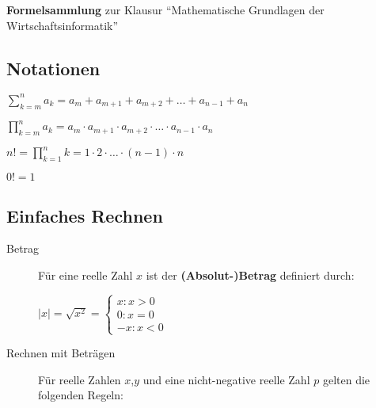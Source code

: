 \documentclass[9pt,ngerman,a4paper,landscape]{scrartcl}
\date{}
\providecommand{\tightlist}{%
  \setlength{\itemsep}{0pt}\setlength{\parskip}{0pt}}
\begin{document}
%
%
%

{\Huge\sffamily\textcolor{FOMVoll}{{\bfseries Formelsammlung} zur Klausur \enquote{Mathematische Grundlagen der Wirtschaftsinformatik}}}

\setlength{\columnsep}{0.75cm}
\begin{multicols}{3}

\hypertarget{notationen}{%
\subsection{Notationen}\label{notationen}}

\begin{description}
\tightlist
\item[Summenzeichen]
\(\displaystyle \sum\limits_{k=m}^n a_k = a_m + a_{m+1} + a_{m+2} + \dotsc + a_{n-1} + a_{n}\)
\item[Produktzeichen]
\(\displaystyle \prod\limits_{k=m}^n a_k = a_m \cdot a_{m+1} \cdot a_{m+2} \cdot \dotsc \cdot a_{n-1} \cdot a_{n}\)
\item[Fakultät]
\(\displaystyle n! = \prod\limits_{k=1}^n k = 1 \cdot 2 \cdot \dotsc \cdot (n-1) \cdot n\)

\(\displaystyle 0! = 1\)
\end{description}

\hypertarget{einfaches-rechnen}{%
\subsection{Einfaches Rechnen}\label{einfaches-rechnen}}

\begin{description}
\item[Betrag]
Für eine reelle Zahl \(x\) ist der \textbf{(Absolut-)Betrag} definiert
durch:

\(\displaystyle |x| = \sqrt{x^2} = \begin{cases} x : x > 0 \\ 0 : x=0 \\ -x : x <0 \end{cases}\)
\item[Rechnen mit Beträgen]
Für reelle Zahlen \(x\),\(y\) und eine nicht-negative reelle Zahl \(p\)
gelten die folgenden Regeln:


\end{description}
\end{multicols}
\end{document}
